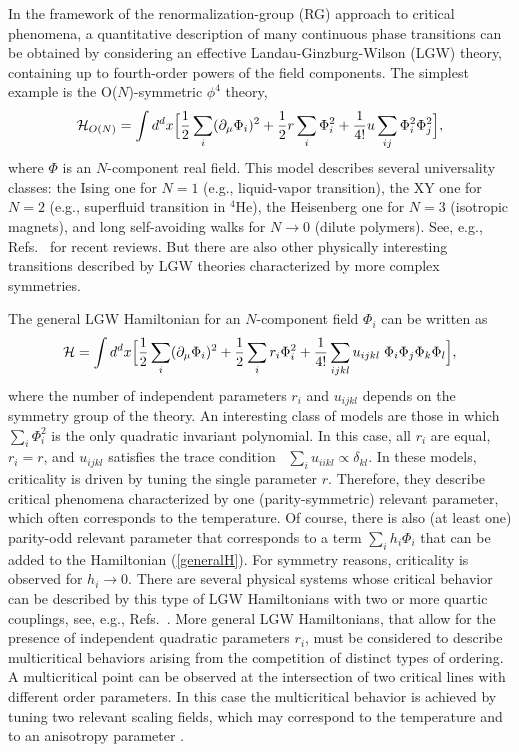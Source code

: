 \documentclass[a4paper,12pt]{article}
\begin{document}
In the framework of the renormalization-group (RG)
approach to critical phenomena,
a quantitative description of 
many continuous phase transitions  can be obtained
by considering an effective Landau-Ginzburg-Wilson (LGW) theory,
containing up to fourth-order powers of the field components.
The simplest example is the O($N$)-symmetric $\phi^4$ theory,
\begin{equation}
{\cal H}_{O(N)} = \int d^d x \Bigl[ 
{1\over 2} \sum_i (\partial_\mu \Phi_{i})^2 + 
{1\over 2} r \sum_i \Phi_{i}^2  + 
{1\over 4!} u \sum_{ij} \Phi_i^2 \Phi_j^2 \Bigr], 
\label{HON}
\end{equation}
where $\Phi$ is an $N$-component real field. This model
describes several universality classes:
the Ising one for $N=1$ 
(e.g., liquid-vapor transition), the XY one for $N=2$
(e.g., superfluid transition in $^4$He),
the Heisenberg one for $N=3$
(isotropic magnets), and long self-avoiding
walks for $N\rightarrow 0$
(dilute polymers).
See, e.g., Refs.~\cite{review,Zinn-Justin-book} for 
recent reviews.
But there are  also other physically interesting 
transitions described by LGW theories
characterized by more complex symmetries.

The general LGW Hamiltonian for an $N$-component field $\Phi_i$
can be written as
\begin{equation}
{\cal H} = \int d^d x \Bigl[ 
{1\over 2} \sum_i (\partial_\mu \Phi_{i})^2 + 
{1\over 2} \sum_i r_i \Phi_{i}^2  + 
{1\over 4!} \sum_{ijkl} u_{ijkl} \; \Phi_i\Phi_j\Phi_k\Phi_l \Bigr], 
\label{generalH}
\end{equation}
where the number of independent parameters $r_i$ and $u_{ijkl}$ 
depends on the symmetry group of the theory. An interesting 
class of models are those in which $\sum_i \Phi^2_i$ is the 
only quadratic invariant polynomial.
In this case, all $r_i$ are equal, $r_i = r$, and 
$u_{ijkl}$ satisfies the trace condition~\cite{BLZ-76}
$\sum_i u_{iikl} \propto \delta_{kl}$.
In these models, criticality is driven by tuning the single parameter
$r$. Therefore, they describe critical phenomena characterized 
by one (parity-symmetric) relevant parameter, 
which often corresponds to the temperature. Of course, there is also
(at least one) parity-odd relevant parameter that corresponds to 
a term $\sum_i h_i \Phi_i$ that can be added to the Hamiltonian
(\ref{generalH}). For symmetry reasons, criticality is observed 
for $h_i\to 0$. 
There are several physical systems whose critical behavior 
can be described by this type of LGW Hamiltonians with two or more quartic 
couplings, see, e.g., Refs.~\cite{Aharony-76,review}.
More general LGW Hamiltonians, that allow for the presence
of independent quadratic parameters $r_i$, must be considered
to describe multicritical behaviors 
arising from the competition of distinct types of ordering.
A multicritical point can be observed at the intersection of 
two critical lines with different order parameters.
In this case the multicritical behavior is achieved
by tuning two relevant scaling fields, which may correspond to
the temperature and to an anisotropy parameter \cite{KNF-76}.
\end{document}
